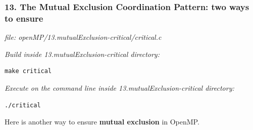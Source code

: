 \documentclass[letterpaper,10pt,openany,oneside]{sphinxmanual}
\begin{document}
\subsubsection{13. The Mutual Exclusion Coordination Pattern: two ways to ensure}
\label{SharedMemory/MutualExclusion:the-mutual-exclusion-coordination-pattern-two-ways-to-ensure}
\emph{file: openMP/13.mutualExclusion-critical/critical.c}

\emph{Build inside 13.mutualExclusion-critical directory:}

\begin{Verbatim}[commandchars=\\\{\}]
make critical
\end{Verbatim}

\emph{Execute on the command line inside 13.mutualExclusion-critical directory:}

\begin{Verbatim}[commandchars=\\\{\}]
./critical
\end{Verbatim}

Here is another way to ensure \textbf{mutual exclusion} in OpenMP.
\end{document}
